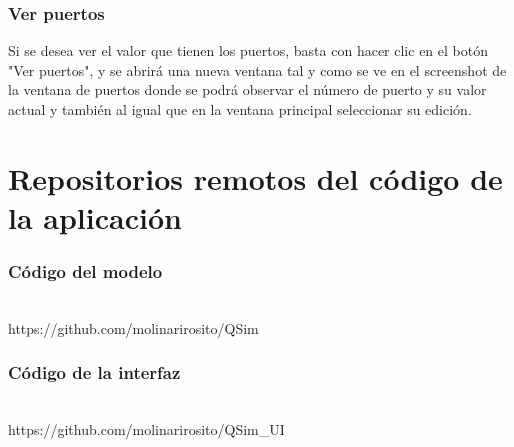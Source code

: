 \subsubsection{Ver puertos}
Si se desea ver el valor que tienen los puertos, basta con hacer clic en el botón "Ver puertos", y se abrirá una nueva ventana tal y como se ve en el screenshot de la ventana de puertos donde se podrá observar el número de puerto y su valor actual y también al igual que en la ventana principal seleccionar su edición.
\\


\section{Repositorios remotos del código de la aplicación}

\subsubsection{Código del modelo}\\
https://github.com/molinarirosito/QSim

\subsubsection{Código de la interfaz}\\
https://github.com/molinarirosito/QSim_UI